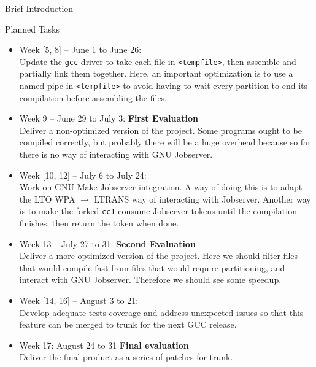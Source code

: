 \documentclass[12pt]{article}
\begin{document}
\begin{section}{Brief Introduction}
\begin{section}{Planned Tasks}
\begin{itemize}
 \item{Week [5, 8] -- June 1 to June 26:} \\
  Update the \texttt{gcc} driver to take each file in \texttt{<tempfile>}, then
  assemble and partially link them together. Here, an important optimization is
  to use a named pipe in \texttt{<tempfile>} to avoid having to wait every
  partition to end its compilation before assembling the files.

 \item{Week 9 -- June 29 to July 3:} \textbf{First Evaluation} \\
  Deliver a non-optimized version of the project. Some programs ought to be
  compiled correctly, but probably there will be a huge overhead because so far
  there is no way of interacting with GNU Jobserver.

 \item{Week [10, 12] -- July 6 to July 24:} \\
  Work on GNU Make Jobserver integration. A way of doing this is to adapt
  the LTO WPA $\rightarrow$ LTRANS way of interacting with Jobserver. Another
  way is to make the forked \texttt{cc1} consume Jobserver tokens until the
  compilation finishes, then return the token when done.

 \item{Week 13 -- July 27 to 31:} \textbf{Second Evaluation} \\
  Deliver a more optimized version of the project. Here we should filter files
  that would compile fast from files that would require partitioning, and
  interact with GNU Jobserver. Therefore we should see some speedup.

\item{Week [14, 16] -- August 3 to 21:} \\
  Develop adequate tests coverage and address unexpected issues
  so that this feature can be merged to trunk for the next GCC
  release.

\item{Week 17: August 24 to 31} \textbf{Final evaluation}\\
  Deliver the final product as a series of patches for trunk.


\end{itemize}
\end{section}

\end{section}
\end{document}
